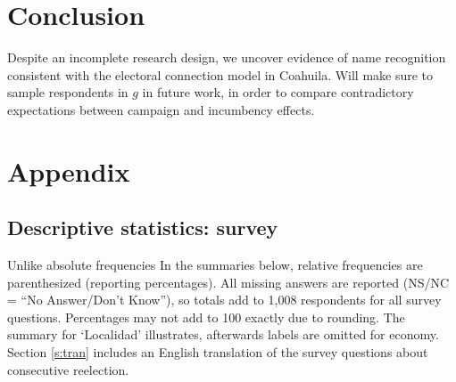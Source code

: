 \documentclass[letter,12pt]{article}
\begin{document}
\section{Conclusion}

Despite an incomplete research design, we uncover evidence of name recognition consistent with the electoral connection model in Coahuila. Will make sure to sample respondents in $g$ in future work, in order to compare contradictory expectations between campaign and incumbency effects.  





\newpage
\section{Appendix}

\subsection{Descriptive statistics: survey}

Unlike absolute frequencies In the summaries below, relative frequencies are parenthesized (reporting percentages). All missing answers are reported (NS/NC = ``No Answer/Don't Know''), so totals add to 1,008 respondents for all survey questions. Percentages may not add to 100 exactly due to rounding. The summary for `Localidad' illustrates, afterwards labels are omitted for economy. Section \ref{s:tran} includes an English translation of the survey questions about consecutive reelection. 
\end{document}
